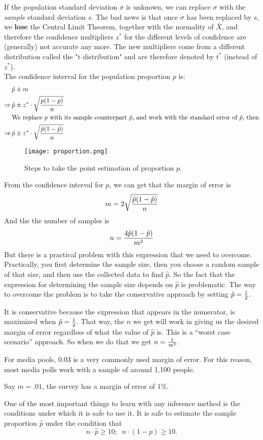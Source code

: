 \documentclass[10pt, a4paper]{article}
\begin{document}
If the population standard deviation $\sigma$ is unknown, we can replace $\sigma$ with the \emph{sample} standard deviation $s$. The bad news is that once $\sigma$ has been replaced by $s$, we \textbf{lose} the Central Limit Theorem, together with the normality of $\bar{X}$, and therefore the confidence multipliers $z^*$ for the different levels of confidence are (generally) not accurate any more. The new multipliers come from a different distribution called the "t distribution" and are therefore denoted by $t^*$ (instead of $z^*$).\\
The confidence interval for the population proportion $p$ is:
\begin{align}
& \hat{p}\pm m \nonumber \\
\Rightarrow \, & \hat{p} \pm z^* \cdot \sqrt{p(1-p)\over n} \nonumber \\
&\text{We replace $p$ with its sample counterpart $\hat{p}$, and work with the standard error of $\hat{p}$, then} \nonumber \\
\Rightarrow \, & \hat{p} \pm z^* \cdot \sqrt{\hat{p}(1-\hat{p})\over n} \nonumber 
\end{align}
\begin{figure}[h!]
\centering
\texttt{[image: proportion.png]}
\caption{Steps to take the point estimation of proportion $p$.}
\end{figure}
From the confidence interval for $p$, we can get that the margin of error is
\begin{equation}
  m=2\sqrt{\hat{p}(1-\hat{p})\over n}\nonumber
\end{equation}
And the the number of samples is
\begin{equation}
  n={4\hat{p}(1-\hat{p})\over m^2}
\end{equation}
But there is a practical problem with this expression that we need to overcome. Practically, you first determine the sample size, then you choose a random sample of that size, and then use the collected data to find $\hat{p}$. So the fact that the expression for determining the sample size depends on $\hat{p}$ is problematic. The way to overcome the problem is to take the conservative approach by setting $\hat{p}={1\over 2}$.\par
It is conservative because the expression that appears in the numerator, is maximized when $\hat{p}={1\over 2}$. That way, the $n$ we get will work in giving us the desired margin of error regardless of what the value of $\hat{p}$ is. This is a ``worst case scenario'' approach. So when we do that we get $n={1\over m^2}$.\par
For media pools, $0.03$ is a very commonly used margin of error. For this reason, most media polls work with a sample of around 1,100 people.\par
Say $m=.01$, the survey has a margin of error of $1\%$. \par
One of the most important things to learn with any inference method is the conditions under which it is safe to use it. It is safe to estimate the sample proportion $\hat{p}$ under the condition that
\begin{equation}
    n\cdot \hat{p}\geq 10; \;\; n \cdot (1-p)\geq 10.\nonumber
\end{equation}
\end{document}
